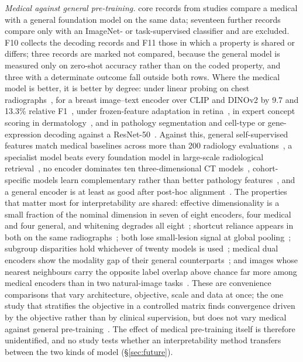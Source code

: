 \emph{Medical against general pre-training.} \Nmvgrec{} core records from \Nmvgstud{} studies compare a
medical with a general foundation model on the same data; seventeen further
records compare only with an ImageNet- or task-supervised classifier and are excluded. F10 collects the
decoding records and F11 those in which a property is shared or differs; three records are marked not
compared, because the general model is measured only on zero-shot accuracy rather than on the coded
property, and three with a determinate outcome fall outside both rows. Where the medical model is better,
it is better by degree: under linear probing on chest radiographs~\cite{li2025featurequality}, for a breast
image--text encoder over CLIP and DINOv2 by 9.7 and 13.3\% relative F1~\cite{germani2025bias}, under
frozen-feature adaptation in retina~\cite{zhou2025generalist}, in expert concept scoring in
dermatology~\cite{kim2024transparent,song2024morphological}, and in pathology segmentation and cell-type
or gene-expression decoding against a ResNet-50~\cite{gildenblat2024segmentation,cui2026translating}.
Against this, general self-supervised features match medical baselines across more than 200 radiology
evaluations~\cite{baharoon2023dinov2}, a specialist model beats every foundation model in large-scale
radiological retrieval~\cite{denner2024leveraging}, no encoder dominates ten three-dimensional CT
models~\cite{chevli2026frozenct}, cohort-specific models learn complementary rather than better pathology
features~\cite{neidlinger2025benchmark}, and a general encoder is at least as good after post-hoc
alignment~\cite{folco2025semantic,wesp2026sparse}. The properties that matter most for interpretability
are shared: effective dimensionality is a small fraction of the nominal dimension in seven of eight
encoders, four medical and four general, and whitening degrades all eight~\cite{garciahidalgo2026embedding};
shortcut reliance appears in both on the same radiographs~\cite{li2025featurequality,sourget2025fairness};
both lose small-lesion signal at global pooling~\cite{muthyala2026frozen}; subgroup disparities hold
whichever of twenty models is used~\cite{jin2024fairmedfm}; medical dual encoders show the modality gap of
their general counterparts~\cite{restrepo2026cone}; and images whose nearest neighbours carry the opposite
label overlap above chance far more among medical encoders than in two natural-image
tasks~\cite{arasteh2026candor}. These are convenience comparisons that vary architecture, objective, scale
and data at once; the one study that stratifies the objective in a controlled matrix finds convergence
driven by the objective rather than by clinical supervision, but does not vary medical against general
pre-training~\cite{tayebiarasteh2026self}. The effect of medical pre-training itself is therefore
unidentified, and no study tests whether an interpretability method transfers between the two kinds of
model (\S\ref{sec:future}).

